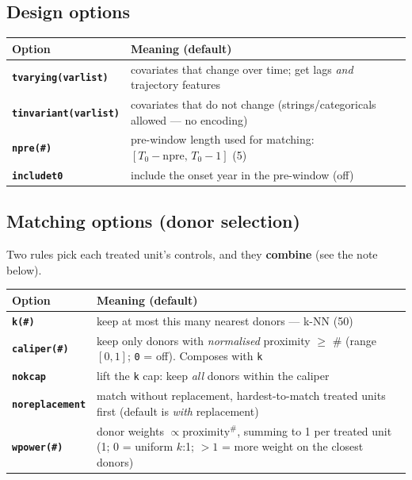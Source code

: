 \documentclass[11pt,a4paper]{article}
\newcommand{\opt}[1]{\texttt{\textbf{#1}}}
\newcommand{\code}[1]{\texttt{#1}}
\begin{document}
\subsection{Design options}
\begin{tabularx}{\textwidth}{@{}lX@{}}
\toprule
Option & Meaning (default)\\
\midrule
\opt{tvarying(varlist)}   & covariates that change over time; get lags \emph{and} trajectory features\\
\opt{tinvariant(varlist)} & covariates that do not change (strings/categoricals allowed --- no encoding)\\
\opt{npre(\#)}            & pre-window length used for matching: $[T_0-\text{npre},\,T_0-1]$ (5)\\
\opt{includet0}          & include the onset year in the pre-window (off)\\
\bottomrule
\end{tabularx}

\subsection{Matching options (donor selection)}
Two rules pick each treated unit's controls, and they \textbf{combine} (see the note below).

\begin{tabularx}{\textwidth}{@{}lX@{}}
\toprule
Option & Meaning (default)\\
\midrule
\opt{k(\#)}          & keep at most this many nearest donors --- k-NN (50)\\
\opt{caliper(\#)}    & keep only donors with \emph{normalised} proximity $\ge$ \# (range $[0,1]$;
\code{0} = off). Composes with \code{k}\\
\opt{nokcap}         & lift the \code{k} cap: keep \emph{all} donors within the caliper\\
\opt{noreplacement}  & match without replacement, hardest-to-match treated units first (default is \emph{with} replacement)\\
\opt{wpower(\#)}     & donor weights $\propto \text{proximity}^{\#}$, summing to 1 per treated unit (1; 0 = uniform $k$:1; $>1$ = more weight on the closest donors)\\
\bottomrule
\end{tabularx}
\end{document}
